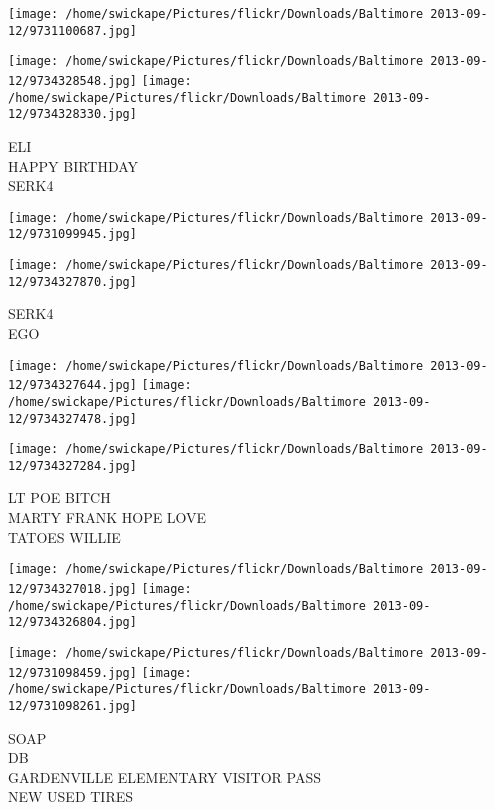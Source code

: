 \documentclass[10pt,letterpaper]{article}
\begin{document}
\texttt{[image: /home/swickape/Pictures/flickr/Downloads/Baltimore 2013-09-12/9731100687.jpg]}

\vspace{0.25in}
\texttt{[image: /home/swickape/Pictures/flickr/Downloads/Baltimore 2013-09-12/9734328548.jpg]}
\texttt{[image: /home/swickape/Pictures/flickr/Downloads/Baltimore 2013-09-12/9734328330.jpg]}

ELI\\
HAPPY BIRTHDAY\\
SERK4\\
\pagebreak

\texttt{[image: /home/swickape/Pictures/flickr/Downloads/Baltimore 2013-09-12/9731099945.jpg]}

\vspace{0.25in}
\texttt{[image: /home/swickape/Pictures/flickr/Downloads/Baltimore 2013-09-12/9734327870.jpg]}

SERK4\\
EGO\\
\pagebreak

\texttt{[image: /home/swickape/Pictures/flickr/Downloads/Baltimore 2013-09-12/9734327644.jpg]}
\texttt{[image: /home/swickape/Pictures/flickr/Downloads/Baltimore 2013-09-12/9734327478.jpg]}

\vspace{0.25in}
\texttt{[image: /home/swickape/Pictures/flickr/Downloads/Baltimore 2013-09-12/9734327284.jpg]}

LT POE BITCH\\
MARTY FRANK HOPE LOVE\\
TATOES WILLIE\\
\pagebreak

\texttt{[image: /home/swickape/Pictures/flickr/Downloads/Baltimore 2013-09-12/9734327018.jpg]}
\texttt{[image: /home/swickape/Pictures/flickr/Downloads/Baltimore 2013-09-12/9734326804.jpg]}

\texttt{[image: /home/swickape/Pictures/flickr/Downloads/Baltimore 2013-09-12/9731098459.jpg]}
\texttt{[image: /home/swickape/Pictures/flickr/Downloads/Baltimore 2013-09-12/9731098261.jpg]}

SOAP\\
DB\\
GARDENVILLE ELEMENTARY VISITOR PASS\\
NEW USED TIRES\\
\pagebreak
\end{document}
